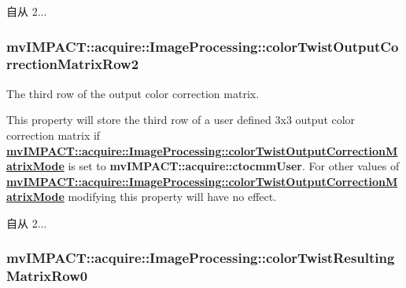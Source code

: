 \begin{DoxySince}{自从}
2... 
\end{DoxySince}
\hypertarget{classmv_i_m_p_a_c_t_1_1acquire_1_1_image_processing_abe3fe5344ec8268ad6936c0401c8231b}{
\subsubsection[{color\+Twist\+Output\+Correction\+Matrix\+Row2}]{ mv\+I\+M\+P\+A\+C\+T\+::acquire\+::\+Image\+Processing\+::color\+Twist\+Output\+Correction\+Matrix\+Row2}}\label{classmv_i_m_p_a_c_t_1_1acquire_1_1_image_processing_abe3fe5344ec8268ad6936c0401c8231b}


The third row of the output color correction matrix. 

This property will store the third row of a user defined 3x3 output color correction matrix if {\bfseries \hyperlink{classmv_i_m_p_a_c_t_1_1acquire_1_1_image_processing_a9c592b9bee390d8f918b0ef837604fae}{mv\+I\+M\+P\+A\+C\+T\+::acquire\+::\+Image\+Processing\+::color\+Twist\+Output\+Correction\+Matrix\+Mode}} is set to {\bfseries mv\+I\+M\+P\+A\+C\+T\+::acquire\+::ctocmm\+User}. For other values of {\bfseries \hyperlink{classmv_i_m_p_a_c_t_1_1acquire_1_1_image_processing_a9c592b9bee390d8f918b0ef837604fae}{mv\+I\+M\+P\+A\+C\+T\+::acquire\+::\+Image\+Processing\+::color\+Twist\+Output\+Correction\+Matrix\+Mode}} modifying this property will have no effect.

\begin{DoxySince}{自从}
2... 
\end{DoxySince}
\hypertarget{classmv_i_m_p_a_c_t_1_1acquire_1_1_image_processing_ad95d05e048058217b600eec09753435f}{
\subsubsection[{color\+Twist\+Resulting\+Matrix\+Row0}]{ mv\+I\+M\+P\+A\+C\+T\+::acquire\+::\+Image\+Processing\+::color\+Twist\+Resulting\+Matrix\+Row0}}\label{classmv_i_m_p_a_c_t_1_1acquire_1_1_image_processing_ad95d05e048058217b600eec09753435f}


